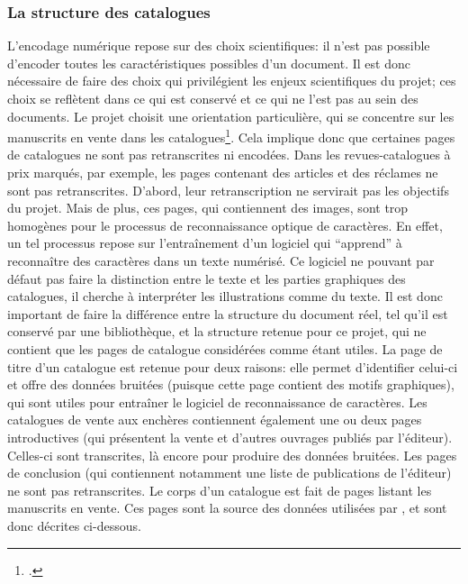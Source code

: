 \subsubsection{La structure des catalogues}
L'encodage numérique repose sur des choix scientifiques: il n'est pas possible d'encoder toutes les caractéristiques possibles d'un document. Il est donc nécessaire de faire des choix qui privilégient les enjeux scientifiques du projet; ces choix se reflètent dans ce qui est conservé et ce qui ne l'est pas au sein  des documents. Le projet \mssktb{} choisit une orientation particulière, qui se concentre sur les manuscrits en vente dans les catalogues\footcite[p. 27]{rondeau_du_noyer_encoder_2019}. Cela implique donc que certaines pages de catalogues ne sont pas retranscrites ni encodées. Dans les revues-catalogues à prix marqués, par exemple, les pages contenant des articles et des réclames ne sont pas retranscrites. D'abord, leur retranscription ne servirait pas les objectifs du projet. Mais de plus, ces pages, qui contiennent des images, sont trop homogènes pour le processus de reconnaissance optique de caractères. En effet, un tel processus repose sur l'entraînement d'un logiciel qui \enquote{apprend} à reconnaître des caractères dans un texte numérisé. Ce logiciel ne pouvant par défaut pas faire la distinction entre le texte et les parties graphiques des catalogues, il cherche à interpréter les illustrations comme du texte. Il est donc important de faire la différence entre la structure du document réel, tel qu'il est conservé par une bibliothèque, et la structure retenue pour ce projet, qui ne contient que les pages de catalogue considérées comme étant utiles. La page de titre d'un catalogue est retenue pour deux raisons: elle permet d'identifier celui-ci et offre des données bruitées (puisque cette page contient des motifs graphiques), qui sont utiles pour entraîner le logiciel de reconnaissance de caractères. Les catalogues de vente aux enchères contiennent également une ou deux pages introductives (qui présentent la vente et d'autres ouvrages publiés par l'éditeur). Celles-ci sont transcrites, là encore pour produire des données bruitées. Les pages de conclusion (qui contiennent notamment une liste de publications de l'éditeur) ne sont pas retranscrites. Le corps d'un catalogue est fait de pages listant les manuscrits en vente. Ces pages sont la source des données utilisées par \mssktb{}, et sont donc décrites ci-dessous.

